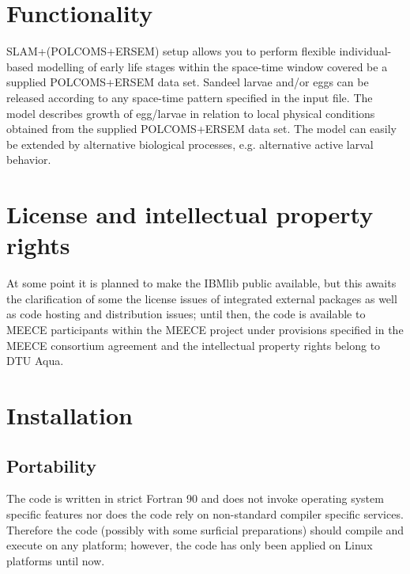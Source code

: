 \section{Functionality}

SLAM+(POLCOMS+ERSEM) setup allows you to perform flexible individual-based modelling
of early life stages within the space-time window covered be a supplied POLCOMS+ERSEM
data set. Sandeel larvae and/or eggs can be released according to any space-time pattern
specified in the input file. The model describes growth of egg/larvae in relation to
local physical conditions obtained from the supplied POLCOMS+ERSEM data set. The model 
can easily be extended by alternative biological processes, e.g. alternative 
active larval behavior.

\section{License and intellectual property rights}

At some point it is planned to make the IBMlib public available, but
this awaits the clarification of some the license issues of integrated 
external packages as well as code hosting and distribution issues; until
then, the code is available to MEECE participants within the MEECE project
under provisions specified in the MEECE consortium agreement and the 
intellectual property rights belong to DTU Aqua.

\section{Installation}

\subsection{Portability} 
The code is written in strict Fortran 90 and does not 
invoke operating system specific features nor does the 
code rely on non-standard compiler specific services.
Therefore the code (possibly with some surficial preparations)
should compile and execute on any platform; however, the
code has only been applied on Linux platforms until now.

